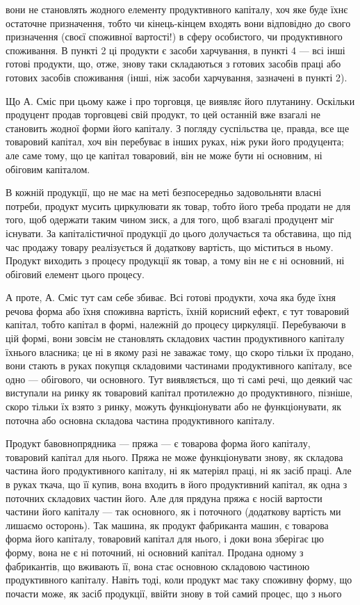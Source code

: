\parcont{}  %
вони не становлять жодного елементу продуктивного капіталу, хоч яке
буде їхнє остаточне призначення, тобто чи кінець-кінцем входять вони
відповідно до свого призначення (своєї споживної вартості!) в сферу особистого,
чи продуктивного споживання. В пункті 2 ці продукти є засоби
харчування, в пункті 4 — всі інші готові продукти, що, отже, знову таки
складаються з готових засобів праці або готових засобів споживання
(інші, ніж засоби харчування, зазначені в пункті 2).

Що А. Сміс при цьому каже і про торговця, це виявляє його плутанину.
Оскільки продуцент продав торговцеві свій продукт, то цей останній
вже взагалі не становить жодної форми його капіталу. З погляду
суспільства це, правда, все ще товаровий капітал, хоч він перебуває в
інших руках, ніж руки його продуцента; але саме тому, що це капітал
товаровий, він не може бути ні основним, ні обіговим капіталом.

В кожній продукції, що не має на меті безпосередньо задовольняти
власні потреби, продукт мусить циркулювати як товар, тобто його
треба продати не для того, щоб одержати таким чином зиск, а для того,
щоб взагалі продуцент міг існувати. За капіталістичної продукції до
цього долучається та обставина, що під час продажу товару реалізується
й додаткову вартість, що міститься в ньому. Продукт виходить з процесу
продукції як товар, а тому він не є ні основний, ні обіговий елемент
цього процесу.

А проте, А. Сміс тут сам себе збиває. Всі готові продукти, хоча
яка буде їхня речова форма або їхня споживна вартість, їхній корисний
ефект, є тут товаровий капітал, тобто капітал в формі, належній до процесу
циркуляції. Перебуваючи в цій формі, вони зовсім не становлять
складових частин продуктивного капіталу їхнього власника; це ні в якому
разі не заважає тому, що скоро тільки їх продано, вони стають в
руках покупця складовими частинами продуктивного капіталу, все одно —
обігового, чи основного. Тут виявляється, що ті самі речі, що деякий
час виступали на ринку як товаровий капітал протилежно до продуктивного,
пізніше, скоро тільки їх взято з ринку, можуть функціонувати або
не функціонувати, як поточна або основна складова частина продуктивного
капіталу.

Продукт бавовнопрядника — пряжа — є товарова форма його капіталу,
товаровий капітал для нього. Пряжа не може функціонувати знову, як
складова частина його продуктивного капіталу, ні як матеріял праці, ні
як засіб праці. Але в руках ткача, що її купив, вона входить в його
продуктивний капітал, як одна з поточних складових частин його. Але
для прядуна пряжа є носій вартости частини його капіталу — так основного,
як і поточного (додаткову вартість ми лишаємо осторонь). Так
машина, як продукт фабриканта машин, є товарова форма його капіталу,
товаровий капітал для нього, і доки вона зберігає цю форму, вона не є
ні поточний, ні основний капітал. Продана одному з фабрикантів, що
вживають її, вона стає основною складовою частиною продуктивного капіталу.
Навіть тоді, коли продукт має таку споживну форму, що почасти
може, як засіб продукції, ввійти знову в той самий процес, що з нього
\parbreak{}  %
